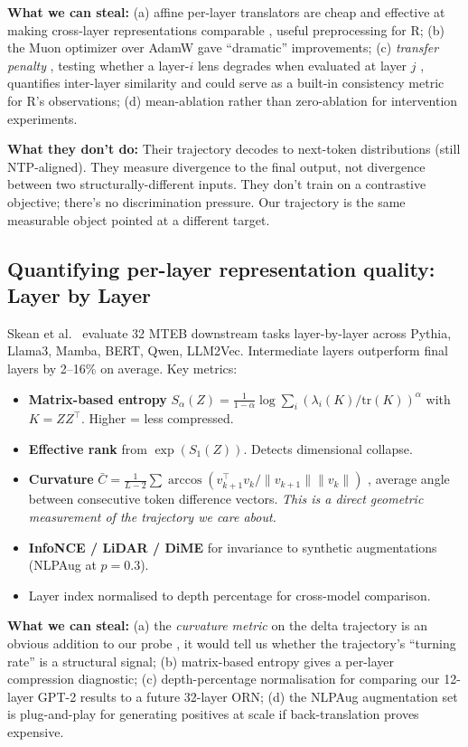 \documentclass[10pt, twocolumn, a4paper]{article}
\begin{document}
\textbf{What we can steal:} (a) affine per-layer translators are cheap and effective at making cross-layer representations comparable ,  useful preprocessing for R; (b) the Muon optimizer over AdamW gave ``dramatic'' improvements; (c) \emph{transfer penalty} ,  testing whether a layer-$i$ lens degrades when evaluated at layer $j$ ,  quantifies inter-layer similarity and could serve as a built-in consistency metric for R's observations; (d) mean-ablation rather than zero-ablation for intervention experiments.

\textbf{What they don't do:} Their trajectory decodes to next-token distributions (still NTP-aligned). They measure divergence to the final output, not divergence between two structurally-different inputs. They don't train on a contrastive objective; there's no discrimination pressure. Our trajectory is the same measurable object pointed at a different target.

\subsection*{Quantifying per-layer representation quality: Layer by Layer}

Skean et al.~\cite{skean2025layer} evaluate 32 MTEB downstream tasks layer-by-layer across Pythia, Llama3, Mamba, BERT, Qwen, LLM2Vec. Intermediate layers outperform final layers by 2--16\% on average. Key metrics:

\begin{itemize}[nosep]
\item \textbf{Matrix-based entropy} $S_\alpha(Z) = \frac{1}{1-\alpha} \log \sum_i (\lambda_i(K)/\mathrm{tr}(K))^\alpha$ with $K = ZZ^\top$. Higher = less compressed.
\item \textbf{Effective rank} from $\exp(S_1(Z))$. Detects dimensional collapse.
\item \textbf{Curvature} $\bar C = \frac{1}{L-2} \sum \arccos(v_{k+1}^\top v_k / \|v_{k+1}\| \|v_k\|)$ ,  average angle between consecutive token difference vectors. \emph{This is a direct geometric measurement of the trajectory we care about.}
\item \textbf{InfoNCE / LiDAR / DiME} for invariance to synthetic augmentations (NLPAug at $p = 0.3$).
\item Layer index normalised to depth percentage for cross-model comparison.
\end{itemize}

\textbf{What we can steal:} (a) the \emph{curvature metric} on the delta trajectory is an obvious addition to our probe ,  it would tell us whether the trajectory's ``turning rate'' is a structural signal; (b) matrix-based entropy gives a per-layer compression diagnostic; (c) depth-percentage normalisation for comparing our 12-layer GPT-2 results to a future 32-layer ORN; (d) the NLPAug augmentation set is plug-and-play for generating positives at scale if back-translation proves expensive.
\end{document}
